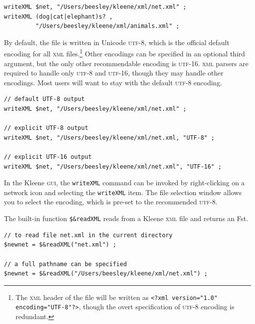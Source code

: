 \documentclass[letterpaper,12pt]{article}
\newcommand{\acro}{\textsc}
\begin{document}
\begin{Verbatim}[fontsize=\small]
writeXML $net, "/Users/beesley/kleene/xml/net.xml" ;
writeXML (dog|cat|elephant)s? , 
         "/Users/beesley/kleene/xml/animals.xml" ;
\end{Verbatim}

\begin{samepage}
\begin{changebar}

By default, the file is written in Unicode \acro{utf-8}, which is the
official default encoding for all \acro{xml} files.\footnote{The
\acro{xml} header of the file will be written as \texttt{<?xml
version="1.0" encoding="UTF-8"?>}, though the overt specification of
\acro{utf-8} encoding is redundant.}  Other encodings can be specified in
an optional third argument, but the only other recommendable encoding is
\acro{utf-16}.  \acro{xml} parsers are required to handle only
\acro{utf-8} and \acro{utf-16}, though they may handle other encodings.
Most users will want to stay with the default \acro{utf-8} encoding.

\begin{Verbatim}[fontsize=\small]
// default UTF-8 output
writeXML $net, "/Users/beesley/kleene/xml/net.xml" ;

// explicit UTF-8 output
writeXML $net, "/Users/beesley/kleene/xml/net.xml, "UTF-8" ;

// explicit UTF-16 output
writeXML $net, "/Users/beesley/kleene/xml/net.xml", "UTF-16" ;
\end{Verbatim}

In the Kleene \acro{gui}, the \verb!writeXML! command can be invoked by
right-clicking on a network icon and selecting the \verb!writeXML!
item.  The file selection window allows you to select the encoding,
which is pre-set to the recommended \acro{utf-8}.

\end{changebar}
\end{samepage}

The built-in function \texttt{\$\&readXML} reads from a Kleene \acro{xml} file and returns an Fst.

\begin{Verbatim}[fontsize=\small]
// to read file net.xml in the current directory
$newnet = $&readXML("net.xml") ;

// a full pathname can be specified
$newnet = $&readXML("/Users/beesley/kleene/xml/net.xml") ;
\end{Verbatim}
\end{document}
